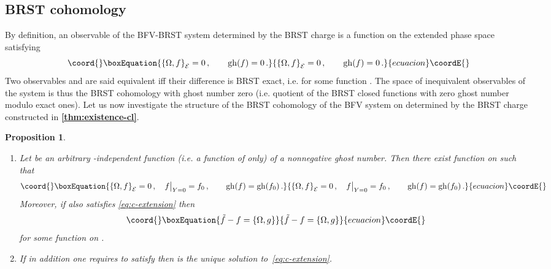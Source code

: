\documentclass[a4paper,11pt]{amsart}
\newtheorem{prop}[thm]{Proposition}
\numberwithin{thm}{section} %
\numberwithin{equation}{section} %
\numberwithin{figure}{section} %
\providecommand{\bref}[1]{{\bf \ref{#1}}}
\providecommand{\pb}[2]{\left\{{}#1{},{}#2{}\right\}}
\providecommand{\gh}[1]{{\rm gh}(#1)}
\renewcommand{\:}{{\rm\, :\,}}
\def\cP{{\mathcal P}}
\def\cc{{\mathcal C}}
\def\cF{{\mathcal F}}
\def\E{{ \mathcal E}}
\begin{document}
\subsection{BRST cohomology}
By definition, an observable of the
BFV-BRST system determined by the BRST charge
\myHighlight{$\Omega$}\coordHE{} is a function \coordHE{} on the extended phase
space satisfying
\begin{equation}\coord{}\boxEquation{
\pb{\Omega}{f}_\E=0\,, \qquad \gh{f}=0\,.
}{
\pb{\Omega}{f}_\E=0\,, \qquad \gh{f}=0\,.
}{ecuacion}\coordE{}\end{equation}
Two observables \coordHE{} and \coordHE{} are said equivalent iff their difference
is BRST exact, i.e. \myHighlight{$f-g=\pb{\Omega}{h}_\E=0$}\coordHE{} for some function
\myHighlight{$h\in\cF(\E)$}\coordHE{}. The space of inequivalent observables of the system is
thus the BRST cohomology with ghost number zero (i.e. quotient of the
BRST closed functions with zero ghost number modulo exact ones).  Let
us now investigate the structure of the BRST cohomology of the BFV
system on \myHighlight{$\E$}\coordHE{} determined by the BRST charge \myHighlight{$\Omega$}\coordHE{} constructed in
\bref{thm:existence-cl}.
\begin{prop}\label{prop:extension-cl}
\begin{enumerate}
\item 
Let \coordHE{} be an arbitrary \coordHE{}-independent function (i.e. a function of
\myHighlight{$x,p,\cc,\cP$}\coordHE{} only) of a nonnegative ghost number. Then there exist
function \coordHE{} on \myHighlight{$\E$}\coordHE{} such that
\begin{equation}\coord{}\boxEquation{
\label{eq:c-extension}
\pb{\Omega}{f}_{\E}=0\,, \quad f{\bigr|}_{Y=0}=f_0\,,\qquad \gh{f}=\gh{f_0}\,.
}{
\pb{\Omega}{f}_{\E}=0\,, \quad f{\bigr|}_{Y=0}=f_0\,,\qquad \gh{f}=\gh{f_0}\,.
}{ecuacion}\coordE{}\end{equation}
Moreover, if \coordHE{} also satisfies \eqref{eq:c-extension} then
\begin{equation}\coord{}\boxEquation{
  \label{eq:c-arbitrarines}
{\tilde f} -f =\pb{\Omega}{g}
}{
  {\tilde f} -f =\pb{\Omega}{g}
}{ecuacion}\coordE{}\end{equation}
for some function \coordHE{} on \myHighlight{$\E$}\coordHE{}.
\item If in addition one requires \coordHE{} to satisfy \coordHE{}
then \coordHE{} is the unique solution to~\eqref{eq:c-extension}.
\end{enumerate}
\end{prop}
\end{document}
